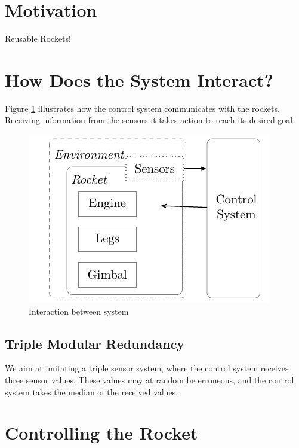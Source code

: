 \documentclass[
]{dtuposter}
\begin{document}
\begin{dtupostercontent}
\section{Motivation}

{\Large Reusable Rockets!}

\section{How Does the System Interact?}

Figure \ref{fig:overview} illustrates how the control system communicates with the rockets.
Receiving information from the sensors it takes action to reach its desired goal.

\begin{figure}
  \includegraphics[width=\linewidth,origin=c]{overview.pdf}
  \caption{Interaction between system}
  \label{fig:overview}
\end{figure}

\subsection{Triple Modular Redundancy}

We aim at imitating a triple sensor system, where the control system receives three sensor values.
These values may at random be erroneous, and the control system takes the median of the received values.

\section{Controlling the Rocket}


\end{dtupostercontent}
\end{document}
